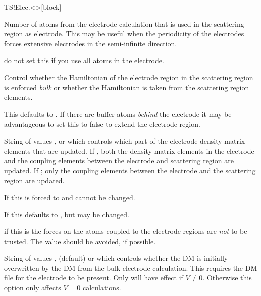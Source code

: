 \begin{fdfentry}{TS!Elec.<>}[block]
\begin{fdfoptions}
    Number of atoms from the electrode calculation that is used in the
    scattering region as electrode. This may be useful when the
    periodicity of the electrodes forces extensive electrodes in the
    semi-infinite direction.

    \note do not set this if you use all atoms in the electrode.

    \option[Bulk]%
    Control whether the Hamiltonian of the electrode region in the
    scattering region is enforced \emph{bulk} or whether the
    Hamiltonian is taken from the scattering region elements.

    This defaults to \fdftrue. If there are buffer atoms \emph{behind}
    the electrode it may be advantageous to set this to false to
    extend the electrode region.

    \option[DM-update]%
    String of values ,  or 
    which controls which part of the electrode density matrix elements
    that are updated. If , both the density matrix elements
    in the electrode and the coupling elements between the electrode
    and scattering region are updated. If ; only the
    coupling elements between the electrode and the scattering region
    are updated.

    If  this is forced to  and
    cannot be changed.

    If  this defaults to ,
    but may be changed.

    \note if this is  the forces on the atoms coupled to
    the electrode regions are \emph{not} to be trusted. The value
     should be avoided, if possible.

    \option[DM-init]%
    String of values ,  (default) or
     which controls whether the DM is initially
    overwritten by the DM from the bulk electrode calculation. This
    requires the DM file for the electrode to be present. Only
     will have effect if $V\neq0$. Otherwise this
    option only affects $V=0$ calculations.


\end{fdfoptions}
\end{fdfentry}
